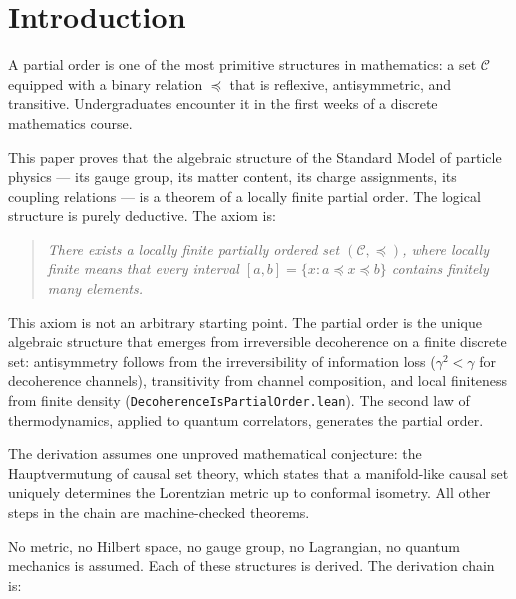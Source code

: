 \documentclass[11pt,letterpaper]{article}
\begin{document}
\section{Introduction}

A partial order is one of the most primitive structures in
mathematics: a set $\mathcal{C}$ equipped with a binary relation
$\preceq$ that is reflexive, antisymmetric, and transitive.
Undergraduates encounter it in the first weeks of a discrete
mathematics course.

This paper proves that the algebraic structure of the Standard Model
of particle physics ---
its gauge group, its matter content, its charge assignments, its
coupling relations --- is a theorem of a locally finite partial order.
The logical structure is purely deductive.  The axiom is:

\begin{quote}
\emph{There exists a locally finite partially ordered set
$(\mathcal{C}, \preceq)$, where locally finite means that every
interval $[a, b] = \{x : a \preceq x \preceq b\}$ contains finitely
many elements.}
\end{quote}

\noindent This axiom is not an arbitrary starting point.  The partial
order is the unique algebraic structure that emerges from irreversible
decoherence on a finite discrete set: antisymmetry follows from the
irreversibility of information loss ($\gamma^2 < \gamma$ for
decoherence channels), transitivity from channel composition, and
local finiteness from finite density
(\texttt{DecoherenceIsPartialOrder.lean}).  The second law of
thermodynamics, applied to quantum correlators, generates the
partial order.

The derivation assumes one unproved mathematical conjecture: the
Hauptvermutung of causal set theory, which states that a
manifold-like causal set uniquely determines the Lorentzian
metric up to conformal isometry.  All other steps in the chain
are machine-checked theorems.

No metric, no Hilbert space, no gauge group, no Lagrangian, no
quantum mechanics is assumed.  Each of these structures is derived.
The derivation chain is:
\end{document}

